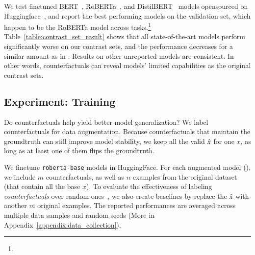 We test finetuned BERT~\cite{devlin-etal-2019-bert}, RoBERTa~\cite{liu2019roberta}, and DistilBERT~\cite{Sanh2019DistilBERTAD} models opensourced on Huggingface~\cite{Wolf2019HuggingFacesTS}, and report the best performing models on the validation set, which happen to be the RoBERTa model across tasks.\footnote{
}
Table~\ref{table:contrast_set_result} shows that all state-of-the-art models perform significantly worse on our contrast sets, and the performance decreases for a similar amount as in \cite{gardner2020contrast}.
Results on other unreported models are consistent.
In other words, \sysname counterfactuals can reveal models' limited capabilities as the original contrast sets.


\subsection{Experiment: Training}

\label{subsec:augmentation}
Do \sysname counterfactuals help yield better model generalization? 
We label counterfactuals for data augmentation.
Because counterfactuals that maintain the groundtruth can still improve model stability, we keep all the valid $\hat{x}$ for one $x$, as long as at least one of them flips the groundtruth.

We finetune \texttt{roberta-base} models in HuggingFace.
For each augmented model (\maug), we include $m$ counterfactuals, as well as $n$ examples from the original dataset (that contain all the base $x$).
To evaluate the effectiveness of labeling \emph{counterfactuals} over random ones~\cite{Khashabi2020MoreBF}, we also create baselines \mcomp by replace the $\hat{x}$ with another $m$ original examples.
The reported performances are averaged across multiple data samples and random seeds (More in Appendix~\ref{appendix:data_collection}).

